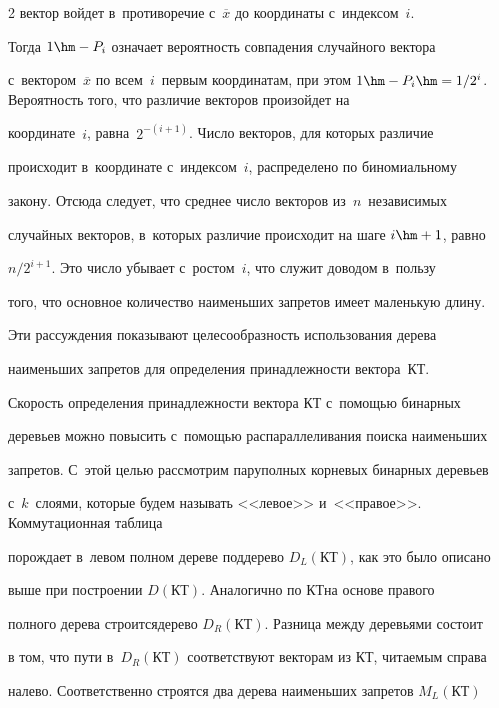\begin{multicols}{2}
вектор войдет в~противоречие с~$\overline{x}$ до координаты с~индексом~$i$. 


Тогда $1\hm- P_i$ означает вероятность совпадения случайного вектора 


с~вектором~$\overline{x}$ по всем~$i$~первым координатам, при этом $1\hm-


P_i \hm= 1/2^i$. Вероятность того, что различие векторов произойдет на 


координате~$i$, равна~$2^{-(i+1)}$. Чис\-ло векторов, для которых различие 


происходит в~координате с~индексом~$i$, распределено по биномиальному 


закону. Отсюда следует, что среднее чис\-ло векторов из~$n$~независимых 


случайных векторов, в~которых различие происходит на шаге $i\hm+1$, равно 


$n/2^{i+1}$. Это чис\-ло убывает с~ростом~$i$, что служит доводом в~пользу 


того, что основное количество наименьших запретов имеет маленькую длину. 


Эти рас\-суж\-де\-ния показывают целесообразность использования дерева 


наименьших запретов для определения принадлежности вектора~КТ. 


  


  Скорость определения принадлежности вектора КТ с~помощью бинарных 


деревьев можно повысить с~помощью распараллеливания поиска наименьших 


запретов. С~этой целью рассмотрим \mbox{пару}\linebreak полных корневых бинарных деревьев 


с~$k$~слоями, которые будем называть <<левое>> и~<<правое>>. Коммутационная таблица 


порождает в~левом полном дереве поддерево $D_L(\mathrm{КТ})$, как это было описано 


выше при по\-стро\-ении  $D(\mathrm{КТ})$. Аналогично по КТ\linebreak на основе правого 


полного дерева строится\linebreak дерево $D_R(\mathrm{КТ})$. Разница между деревьями состоит 


в том, что пути в~$D_R(\mathrm{КТ})$ соответствуют векторам из КТ, читаемым справа 


налево. Соответственно строятся два дерева наименьших запретов $M_L(\mathrm{КТ})$ 



\end{multicols}
